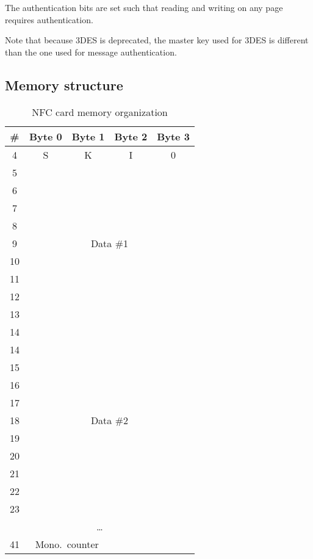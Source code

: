 \documentclass[paper=a4, fontsize=11pt]{scrartcl}
\begin{document}
The authentication bits are set such that reading and writing on any page
requires authentication.

Note that because 3DES is deprecated, the master key used for 3DES is
different than the one used for message authentication.

\subsection{Memory structure}

\begin{table}[H]
    \centering
    \begin{tabular}{|c|c|c|c|c|}
        \hline
        \# & Byte 0 & Byte 1 & Byte 2 & Byte 3 \\
        \hline
        4 & S & K & I & 0 \\
        \hline
        5 & \multicolumn{4}{|c|}{\multirow{9}{*}{Data \#1}} \\
        6 & \multicolumn{4}{|c|}{} \\
        7 & \multicolumn{4}{|c|}{} \\
        8 & \multicolumn{4}{|c|}{} \\
        9 & \multicolumn{4}{|c|}{} \\
        10 & \multicolumn{4}{|c|}{} \\
        11 & \multicolumn{4}{|c|}{} \\
        12 & \multicolumn{4}{|c|}{} \\
        13 & \multicolumn{4}{|c|}{} \\
        14 & \multicolumn{4}{|c|}{} \\
        \hline
        14 & \multicolumn{4}{|c|}{\multirow{9}{*}{Data \#2}} \\
        15 & \multicolumn{4}{|c|}{} \\
        16 & \multicolumn{4}{|c|}{} \\
        17 & \multicolumn{4}{|c|}{} \\
        18 & \multicolumn{4}{|c|}{} \\
        19 & \multicolumn{4}{|c|}{} \\
        20 & \multicolumn{4}{|c|}{} \\
        21 & \multicolumn{4}{|c|}{} \\
        22 & \multicolumn{4}{|c|}{} \\
        23 & \multicolumn{4}{|c|}{} \\
        \hline
        \multicolumn{5}{|c|}{\ldots} \\
        \hline
        41 & \multicolumn{2}{|c|}{Mono.\ counter} & & \\
        \hline
    \end{tabular}
    \caption{NFC card memory organization}
    \label{t1}
\end{table}
\end{document}
